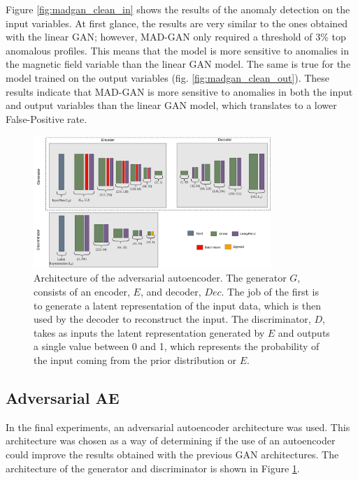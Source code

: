 Figure \ref{fig:madgan_clean_in} shows the results of the anomaly detection on the input variables. At first glance, the results are very similar to the ones obtained with the linear GAN; however, MAD-GAN only required a threshold of 3\% top anomalous profiles. This means that the model is more sensitive to anomalies in the magnetic field variable than the linear GAN model. The same is true for the model trained on the output variables (fig. \ref{fig:madgan_clean_out}). These results indicate that MAD-GAN is more sensitive to anomalies in both the input and output variables than the linear GAN model, which translates to a lower False-Positive rate.

\begin{figure}
    \centering
    \includegraphics[width=0.8\textwidth]{figures/aae_arch.png}
    \caption[Adversarial Autoencoder Architecture]{Architecture of the adversarial autoencoder. The generator $G$, consists of an encoder, $E$, and decoder, $Dec$. The job of the first is to generate a latent representation of the input data, which is then used by the decoder to reconstruct the input. The discriminator, $D$, takes as inputs the latent representation generated by $E$ and outputs a single value between 0 and 1, which represents the probability of the input coming from the prior distribution or $E$.}
    \label{fig:aae_architecture}
\end{figure}

\subsection{Adversarial AE}\label{sec:aae}
In the final experiments, an adversarial autoencoder architecture was used. This architecture was chosen as a way of determining if the use of an autoencoder could improve the results obtained with the previous GAN architectures. The architecture of the generator and discriminator is shown in Figure \ref{fig:aae_architecture}. 

